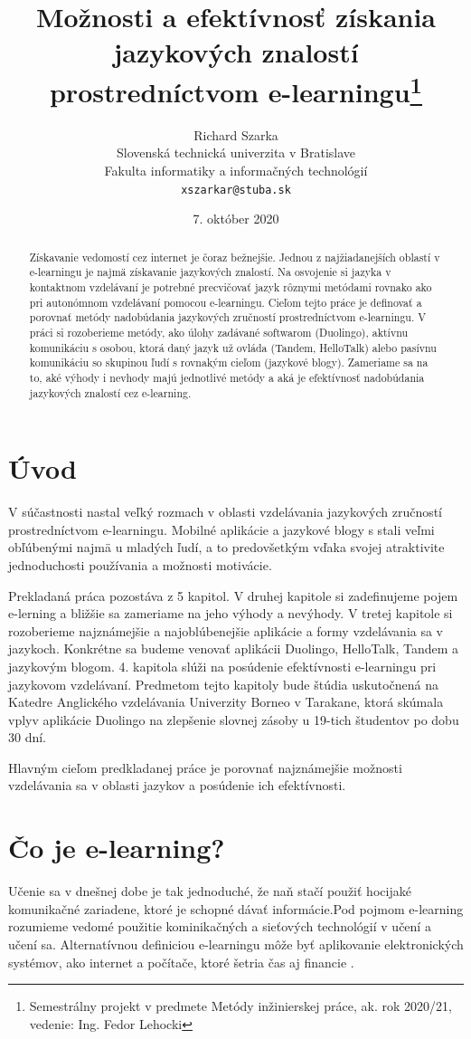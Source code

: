 \documentclass[10pt,oneside,slovak,a4paper]{article}
\title{Možnosti a efektívnosť získania jazykových znalostí prostredníctvom
e-learningu\thanks{Semestrálny projekt v predmete Metódy inžinierskej práce, ak. rok 2020/21, vedenie: Ing. Fedor Lehocki }} %
\author{Richard Szarka\\[2pt]
	{\small Slovenská technická univerzita v Bratislave}\\
	{\small Fakulta informatiky a informačných technológií}\\
	{\small \texttt{xszarkar@stuba.sk}}
	}
\date{\small 7. október 2020} %
\begin{document}
\maketitle

\begin{abstract}
Získavanie vedomostí cez internet je čoraz bežnejšie. Jednou z najžiadanejších oblastí v e-learningu je najmä získavanie jazykových znalostí. Na osvojenie si jazyka v kontaktnom vzdelávaní je potrebné precvičovať jazyk rôznymi metódami rovnako ako pri autonómnom vzdelávaní pomocou e-learningu. Cieľom tejto práce je definovať a porovnať metódy nadobúdania jazykových zručností prostredníctvom e-learningu. V práci si rozoberieme metódy, ako úlohy zadávané softwarom (Duolingo), aktívnu komunikáciu s osobou, ktorá daný jazyk už ovláda (Tandem, HelloTalk) alebo pasívnu komunikáciu so skupinou ľudí s rovnakým cieľom (jazykové blogy). Zameriame sa na to, aké výhody i nevhody majú jednotlivé metódy a aká je efektívnosť nadobúdania jazykových znalostí cez e-learning.
\end{abstract}

\section{Úvod} %
V súčastnosti nastal veľký rozmach v oblasti vzdelávania jazykových zručností prostredníctvom e-learningu. Mobilné aplikácie a jazykové blogy s stali veľmi obľúbenými najmä u mladých ľudí, a to predovšetkým vďaka svojej atraktivite jednoduchosti používania a možnosti motivácie.

Prekladaná práca pozostáva z 5 kapitol. V druhej kapitole si zadefinujeme pojem e-lerning a bližšie sa zameriame na jeho výhody a nevýhody. V tretej kapitole si rozoberieme najznámejšie a najoblúbenejšie aplikácie a formy vzdelávania sa v jazykoch. Konkrétne sa budeme venovať aplikácii Duolingo, HelloTalk, Tandem a jazykovým blogom. 4. kapitola slúži na posúdenie efektívnosti  e-learningu pri jazykovom vzdelávaní. Predmetom tejto kapitoly bude štúdia uskutočnená na Katedre Anglického vzdelávania Univerzity Borneo v Tarakane, ktorá skúmala vplyv aplikácie Duolingo na zlepšenie slovnej zásoby u 19-tich študentov po dobu 30 dní.

Hlavným cieľom predkladanej práce je porovnať najznámejšie možnosti vzdelávania sa v oblasti jazykov a posúdenie ich efektívnosti.

\section{Čo je e-learning?}%
Učenie sa v dnešnej dobe je tak jednoduché, že naň stačí použiť hocijaké komunikačné zariadene, ktoré je schopné dávať informácie\cite{vyhody}.Pod pojmom e-learning rozumieme vedomé použitie kominikačných a sieťových technológií v učení a učení sa. Alternatívnou definiciou e-learningu môže byť aplikovanie elektronických systémov, ako internet a počítače, ktoré šetria čas aj financie \cite{efektivnost}. 
\end{document}
